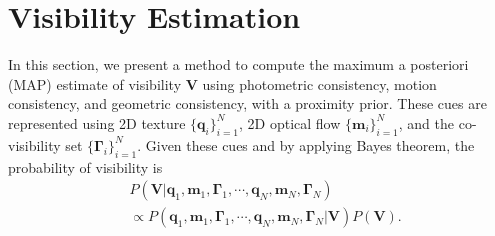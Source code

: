\section{Visibility Estimation\label{sec:Optimal-Visibility-Estimation}}

In this section, we present a method to compute the maximum a posteriori (MAP) estimate of visibility $\mathbf{V}$ using photometric consistency, motion consistency, and geometric consistency, with a proximity prior. These cues are represented using 2D texture $\{ \mathbf{q}_i \}_{i=1}^N$, 2D optical flow $\{ \mathbf{m}_i \}_{i=1}^N$, and the co-visibility set $\{ \bm{\Gamma}_i \}_{i=1}^N$. Given these cues and by applying Bayes theorem, the probability of visibility is
\begin{align}
&P( \mathbf{V} | \mathbf{q}_1, \mathbf{m}_1, \bm{\Gamma}_1, \cdots, \mathbf{q}_N,  \mathbf{m}_N, \bm{\Gamma}_N ) \nonumber\\
&\propto P(\mathbf{q}_1, \mathbf{m}_1, \bm{\Gamma}_1, \cdots, \mathbf{q}_N,  \mathbf{m}_N, \bm{\Gamma}_N |  \mathbf{V}) P(\mathbf{V}).  \nonumber
\end{align}

